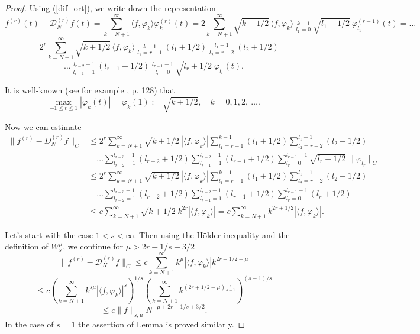 \documentclass[10pt]{extarticle}
\begin{document}
\begin{proof}
Using (\ref{dif_ort}), we write down the representation
$$
f^{(r)}(t)-\mathcal{D}^{(r)}_N f(t) =
\sum_{k=N+1}^\infty \langle f, \varphi_{k} \rangle \varphi_k^{(r)} (t) =
2 \sum_{k=N+1}^\infty \sqrt{k+1/2}\, \langle f, \varphi_{k} \rangle \mathop{{\sum}^*}\limits_{l_1=0}^{k-1}  \sqrt{l_1+1/2} \ \varphi_{l_1}^{(r-1)}(t)= \ldots
$$
$$
	 = 2^r \sum_{k=N+1}^\infty \sqrt{k+1/2}\, \langle f, \varphi_{k} \rangle
	\mathop{{\sum}^*}\limits_{l_1=r-1}^{k-1} (l_1+1/2) \mathop{{\sum}^*}\limits_{l_2=r-2}^{l_1-1} (l_2+1/2)
$$
\begin{equation}  \label{first_dif}
    \ldots
	\mathop{{\sum}^*}\limits_{l_{r-1}=1}^{l_{r-2}-1} (l_{r-1}+1/2)
	\mathop{{\sum}^*}\limits_{l_{r}=0}^{l_{r-1}-1} \sqrt{l_r+1/2} \ \varphi_{l_r}(t)  .
\end{equation}

It is well-known (see for example \cite{Suetin}, p. 128) that
$$
\max_{-1\le t\le 1} |\varphi_k(t)| = \varphi_k(1) := \sqrt{k+1/2},\quad k=0,1,2,\ \ldots .
$$

Now we can estimate
\begin{equation}
\begin{split}
\|f^{(r)} - D_N^{(r)} f\|_C &\leq 2^r \sum_{k=N+1}^{\infty} \sqrt{k + 1/2}\,|\langle f, \varphi_k\rangle| \sum_{l_1=r-1}^{k-1} (l_1 + 1/2) \sum_{l_2=r-2}^{l_1-1} (l_2 + 1/2)  \\
&\quad \ldots \sum_{l_{r-2}=1}^{l_{r-3}-1} (l_{r-2} + 1/2) \sum_{l_{r-1}=1}^{l_{r-2}-1} (l_{r-1} + 1/2) \sum_{l_r=0}^{l_{r-1}-1} \sqrt{l_r + 1/2}\,\|\varphi_{l_r}\|_C \\
&\leq 2^r \sum_{k=N+1}^{\infty} \sqrt{k + 1/2}\,|\langle f, \varphi_k\rangle| \sum_{l_1=r-1}^{k-1} (l_1 + 1/2) \sum_{l_2=r-2}^{l_1-1} (l_2 + 1/2)  \\
&\quad \ldots \sum_{l_{r-2}=1}^{l_{r-3}-1} (l_{r-2} + 1/2) \sum_{l_{r-1}=1}^{l_{r-2}-1} (l_{r-1} + 1/2) \sum_{l_r=0}^{l_{r-1}-1} (l_r + 1/2) \\
& \leq c \sum_{k=N+1}^{\infty} \sqrt{k + 1/2} \ k^{2r}|\langle f, \varphi_k\rangle| = c \sum_{k=N+1}^{\infty} k^{2r+1/2}|\langle f, \varphi_k\rangle|.
\end{split}
\end{equation}

Let's start with the case $1< s< \infty$. Then using the Hölder inequality and the definition of $W^\mu_s$, we continue for $\mu>2r-1/s+3/2$
$$
\|f^{(r)}-\mathcal{D}^{(r)}_N f\|_C \leq c \sum_{k=N+1}^{\infty} k^\mu|\langle f, \varphi_k\rangle|k^{2r+1/2-\mu}
$$
$$
\leq c\left(\sum_{k=N+1}^{\infty} k^{s\mu}|\langle f, \varphi_k\rangle|^s\right)^{1/s} \left(\sum_{k=N+1}^{\infty} k^{(2r+1/2-\mu)\frac{s}{s-1}}\right)^{(s-1)/s}
$$
$$
\leq c\|f\|_{s,\mu} N^{-\mu+2r-1/s+3/2}.
$$
In the case of $s = 1$ the assertion of Lemma is proved similarly.
\end{proof}
\end{document}
